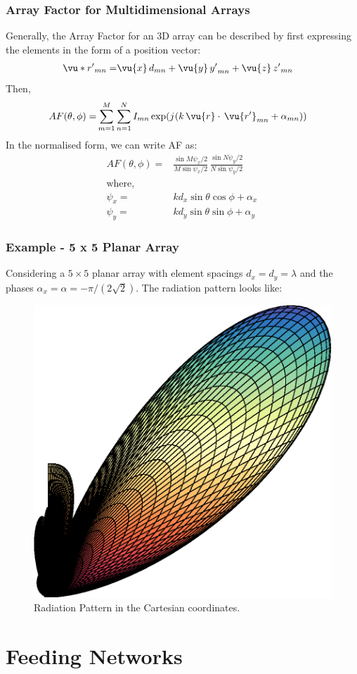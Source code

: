 \documentclass[10pt]{beamer}
\renewcommand{\j}{{j}\mkern1mu} %
\begin{document}
\begin{frame}
    \frametitle{Array Factor for Multidimensional Arrays}
    Generally, the Array Factor for an 3D array can be described by first expressing the elements in the form of a position vector:
    \small
    \begin{align*}
        \vu*{r'}_{mn} {}=& \vu{x} \, {d}_{mn} + \vu{y} \, {y'}_{mn} + \vu{z} \, {z'}_{mn}
    \end{align*}
    Then,
    \begin{align*}
        AF (\theta, \phi ) {}=& \sum_{m = 1}^{M} \sum_{n = 1}^{N} I_{mn} \exp(\j (k \, \vu{r}\cdot \, \vu{r'}_{mn} + \alpha_{mn}))
    \end{align*}
    In the normalised form, we can write AF as:
    \begin{align*}
        AF (\theta, \phi) {}=&  \frac{\sin M \psi_x/2 }{{M \sin \psi_x/2}} \, \frac{\sin N \psi_y/2 }{{N \sin \psi_y/2}} \\
        \text{where,} \\
        \psi_x  {}=& k d_x \sin \theta \cos \phi + \alpha_x \, \\
        \psi_y  {}=& k d_y \sin \theta \sin \phi + \alpha_y
    \end{align*}
\end{frame}

\begin{frame}
    \frametitle{Example - 5 x 5 Planar Array}

    Considering a $5 \times 5$ planar array with element spacings $d_x = d_y =  \lambda$ and the phases $\alpha_x = \alpha = -\pi/(2 \sqrt{2})$. The radiation pattern looks like:
    \begin{figure}[htbp]
        \centering
        \includegraphics[width=.35\textwidth]{3d_polar_plot_3.eps}
        \caption{Radiation Pattern in the Cartesian coordinates.}
    \end{figure}
\end{frame}

\section{Feeding Networks}
\end{document}
